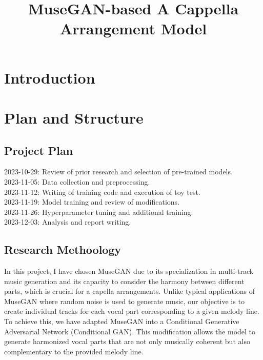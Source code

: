 \documentclass[conference]{IEEEtran}
\begin{document}
\title{MuseGAN-based A Cappella Arrangement Model\\
}

\author{
}

\maketitle

\begin{abstract}

\end{abstract}

\begin{IEEEkeywords}

\end{IEEEkeywords}

\section{Introduction}


\section{Plan and Structure}
\subsection{Project Plan}
2023-10-29: Review of prior research and selection of
pre-trained models.\\
2023-11-05: Data collection and preprocessing.\\
2023-11-12: Writing of training code and execution of
toy test.\\
2023-11-19: Model training and review of modifications.\\
2023-11-26: Hyperparameter tuning and additional
training.\\
2023-12-03: Analysis and report writing.

\subsection{Research Methoology}
In this project, I have chosen MuseGAN due to its specialization in multi-track music generation and its capacity to consider the harmony between different parts, which is crucial for a capella arrangements. Unlike typical applications of MuseGAN where random noise is used to generate music, our objective is to create individual tracks for each vocal part corresponding to a given melody line. To achieve this, we have adapted MuseGAN into a Conditional Generative Adversarial Network (Conditional GAN). This modification allows the model to generate harmonized vocal parts that are not only musically coherent but also complementary to the provided melody line.
\end{document}

